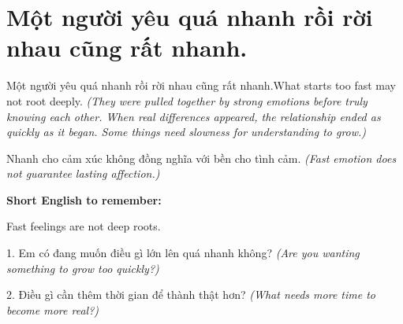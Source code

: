 \section{Một người yêu quá nhanh rồi rời nhau cũng rất nhanh.}
\begin{truyen}{Một người yêu quá nhanh rồi rời nhau cũng rất nhanh.}{What starts too fast may not root deeply.}
\textit{(They were pulled together by strong emotions before truly knowing each other. When real differences appeared, the relationship ended as quickly as it began. Some things need slowness for understanding to grow.)}
\end{truyen}
\begin{baihoc}
Nhanh cho cảm xúc không đồng nghĩa với bền cho tình cảm.
\textit{(Fast emotion does not guarantee lasting affection.)}
\end{baihoc}
\begin{ghinhoanh}
\textbf{Short English to remember:}

Fast feelings are not deep roots.
\end{ghinhoanh}
\begin{tuhocnhanh}
1. Em có đang muốn điều gì lớn lên quá nhanh không? \textit{(Are you wanting something to grow too quickly?)}

2. Điều gì cần thêm thời gian để thành thật hơn? \textit{(What needs more time to become more real?)}
\end{tuhocnhanh}
\ngancach


